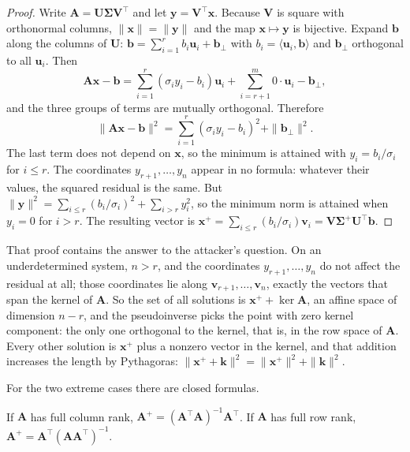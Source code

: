 \begin{proof}
Write $\mathbf{A}=\mathbf{U}\boldsymbol{\Sigma}\mathbf{V}^{\top}$ and let
$\mathbf{y}=\mathbf{V}^{\top}\mathbf{x}$. Because $\mathbf{V}$ is square with orthonormal
columns, $\|\mathbf{x}\|=\|\mathbf{y}\|$ and the map $\mathbf{x}\mapsto\mathbf{y}$ is
bijective. Expand $\mathbf{b}$ along the columns of $\mathbf{U}$:
$\mathbf{b}=\sum_{i=1}^{r}b_{i}\mathbf{u}_{i}+\mathbf{b}_{\perp}$ with
$b_{i}=\langle\mathbf{u}_{i},\mathbf{b}\rangle$ and $\mathbf{b}_{\perp}$ orthogonal
to all $\mathbf{u}_{i}$. Then
\[
  \mathbf{A}\mathbf{x}-\mathbf{b}
  =\sum_{i=1}^{r}(\sigma_{i}y_{i}-b_{i})\mathbf{u}_{i}+\sum_{i=r+1}^{m}0\cdot\mathbf{u}_{i}
   -\mathbf{b}_{\perp},
\]
and the three groups of terms are mutually orthogonal. Therefore
\[
  \|\mathbf{A}\mathbf{x}-\mathbf{b}\|^{2}
  =\sum_{i=1}^{r}(\sigma_{i}y_{i}-b_{i})^{2}+\|\mathbf{b}_{\perp}\|^{2}.
\]
The last term does not depend on $\mathbf{x}$, so the minimum is attained with
$y_{i}=b_{i}/\sigma_{i}$ for $i\le r$. The coordinates $y_{r+1},\dots,y_{n}$ appear in
no formula: whatever their values, the squared residual is the same. But
$\|\mathbf{y}\|^{2}=\sum_{i\le r}(b_{i}/\sigma_{i})^{2}+\sum_{i>r}y_{i}^{2}$, so the
minimum norm is attained when $y_{i}=0$ for $i>r$. The resulting vector is
$\mathbf{x}^{+}=\sum_{i\le r}(b_{i}/\sigma_{i})\mathbf{v}_{i}
=\mathbf{V}\boldsymbol{\Sigma}^{+}\mathbf{U}^{\top}\mathbf{b}$.
\end{proof}

That proof contains the answer to the attacker's question. On an underdetermined system, $n>r$, and
the coordinates $y_{r+1},\dots,y_{n}$ do not affect the residual at all; those coordinates
lie along $\mathbf{v}_{r+1},\dots,\mathbf{v}_{n}$, exactly the vectors that span
the kernel of $\mathbf{A}$. So the set of all solutions is $\mathbf{x}^{+}+\ker\mathbf{A}$, an
affine space of dimension $n-r$, and the pseudoinverse picks the point with zero kernel component:
the only one orthogonal to the kernel, that is, in the row space of $\mathbf{A}$.
Every other solution is $\mathbf{x}^{+}$ plus a nonzero vector in the kernel, and that
addition increases the length by Pythagoras:
$\|\mathbf{x}^{+}+\mathbf{k}\|^{2}=\|\mathbf{x}^{+}\|^{2}+\|\mathbf{k}\|^{2}$.

For the two extreme cases there are closed formulas.

\begin{akibat}
If $\mathbf{A}$ has full column rank, $\mathbf{A}^{+}
=(\mathbf{A}^{\top}\mathbf{A})^{-1}\mathbf{A}^{\top}$. If $\mathbf{A}$ has full
row rank, $\mathbf{A}^{+}=\mathbf{A}^{\top}(\mathbf{A}\mathbf{A}^{\top})^{-1}$.
\end{akibat}

